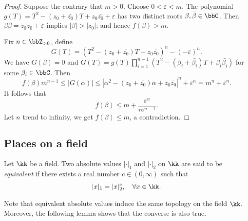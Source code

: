 \begin{proof}
        Suppose the contrary that \(m > 0\).
        Choose \(0 < \varepsilon < m\).
        The polynomial \(g(T) = T^2 - (z_0 + \bar{z_0})T + z_0 \bar{z_0} + \varepsilon\) has two distinct roots \(\beta, \bar{\beta} \in \bbC\).
        Then \(\beta\bar{\beta} = z_0\bar{z_0} + \varepsilon\) implies \(|\beta| > |z_0|\); 
        and hence \(f(\beta) > m\).

        Fix \(n \in \bbZ_{>0}\), define
        \[ G(T) = (T^2 - (z_0 + \bar{z_0})T + z_0 \bar{z_0})^n - (-\varepsilon)^n. \]
        We have \(G(\beta) = 0\) and \(G(T) = g(T) \prod_{i=1}^{n-1} (T^2-(\beta_i+\bar{\beta_i})T+ \beta_i\bar{\beta_i})\) for some \(\beta_i \in \bbC\).
        Then 
        \[ f(\beta) m^{n-1} \leq |G(\alpha)| \leq |\alpha^2 - (z_0 + \bar{z_0})\alpha + z_0 \bar{z_0}|^n + \varepsilon^n = m^n + \varepsilon^n. \]
        It follows that 
        \[ f(\beta) \leq m + \frac{\varepsilon^n}{m^{n-1}}. \]
        Let \(n\) trend to infinity, we get \(f(\beta) \leq m\), a contradiction.
    \end{proof}


\subsection{Places on a field}

    \begin{definition}\label{def:equivalent_of_absolute_values}
        Let \(\kk\) be a field.
        Two absolute values \(|\cdot|_1\) and \(|\cdot|_2\) on \(\kk\) are said to be \emph{equivalent} if there exists a real number \(c \in (0,\infty)\) such that
        \[ |x|_1 = |x|_2^c, \quad \forall x \in \kk. \]
    \end{definition}

    Note that equivalent absolute values induce the same topology on the field \(\kk\).
    Moreover, the following lemma shows that the converse is also true.

